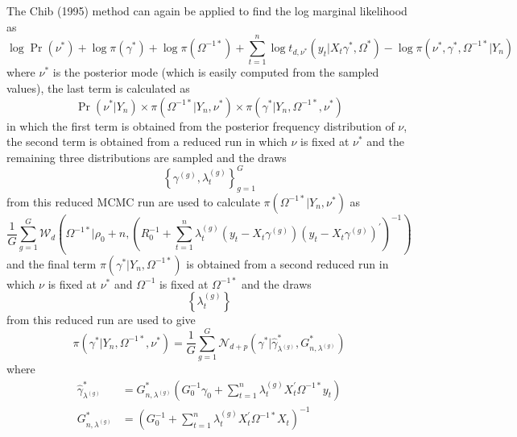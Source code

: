 \documentclass[12pt]{article}
\begin{document}
The Chib (1995) method can again be applied to find the log marginal
likelihood as
\begin{equation*}
\log \Pr \left( \nu ^{\ast }\right) +\log \pi \left( \gamma ^{\ast }\right)
+\log \pi \left( \Omega ^{-1\ast }\right) +\sum_{t=1}^{n}\log t_{d,\nu
^{\ast }}\left( y_{t}|X_{t}\gamma ^{\ast },\Omega ^{\ast }\right) -\log \pi
\left( \nu ^{\ast },\gamma ^{\ast },\Omega ^{-1\ast }|Y_{n}\right)
\end{equation*}%
where $\nu ^{\ast }$ is the posterior mode (which is easily computed from
the sampled values), the last term is calculated as%
\begin{equation*}
\Pr \left( \nu ^{\ast }|Y_{n}\right) \times \pi \left( \Omega ^{-1\ast
}|Y_{n},\nu ^{\ast }\right) \times \pi \left( \gamma ^{\ast }|Y_{n},\Omega
^{-1\ast },\nu ^{\ast }\right)
\end{equation*}%
in which the first term is obtained from the posterior frequency
distribution of $\nu $, the second term is obtained from a reduced run in
which $\nu $ is fixed at $\nu ^{\ast }$ and the remaining three
distributions are sampled and the draws
\begin{equation*}
\left\{ \gamma ^{(g)},\lambda _{t}^{(g)}\right\} _{g=1}^{G}
\end{equation*}%
from this reduced MCMC run are used to calculate $\pi \left( \Omega ^{-1\ast
}|Y_{n},\nu ^{\ast }\right) $ as
\begin{equation*}
\frac{1}{G}\sum_{g=1}^{G}\mathcal{W}_{d}\left( \Omega ^{-1\ast }|\rho
_{0}+n,\left( R_{0}^{-1}+\sum_{t=1}^{n}\lambda _{t}^{(g)}\left(
y_{t}-X_{t}\gamma ^{(g)}\right) \left( y_{t}-X_{t}\gamma ^{(g)}\right)
^{\prime }\right) ^{-1}\right)
\end{equation*}%
and the final term $\pi \left( \gamma ^{\ast }|Y_{n},\Omega ^{-1\ast
}\right) $ is obtained from a second reduced run in which $\nu $ is fixed at
$\nu ^{\ast }$ and $\Omega ^{-1}$ is fixed at $\Omega ^{-1\ast }$ and the
draws
\begin{equation*}
\left\{ \lambda _{t}^{(g)}\right\}
\end{equation*}%
from this reduced run are used to give
\begin{equation*}
\pi (\gamma ^{\ast }|Y_{n},\Omega ^{-1\ast },\nu ^{\ast })=\frac{1}{G}%
\sum_{g=1}^{G}\mathcal{N}_{d+p}\left( \gamma ^{\ast }|\hat{\gamma}_{\lambda
^{(g)}}^{\ast },G_{n,\lambda ^{(g)}}^{\ast }\right)
\end{equation*}%
where%
\begin{align*}
\hat{\gamma}_{\lambda ^{(g)}}^{\ast }& =G_{n,\lambda ^{(g)}}^{\ast }\left(
G_{0}^{-1}\gamma _{0}+\sum_{t=1}^{n}\lambda _{t}^{(g)}X_{t}^{\prime }\Omega
^{-1\ast }y_{t}\right)  \\
G_{n,\lambda ^{(g)}}^{\ast }& =\left( G_{0}^{-1}+\sum_{t=1}^{n}\lambda
_{t}^{(g)}X_{t}^{\prime }\Omega ^{-1\ast }X_{t}\right) ^{-1}
\end{align*}
\end{document}

